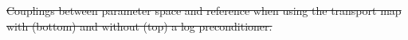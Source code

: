 \documentclass[final]{siamltex}
\newcommand\irregularcircle[2]{%
  \pgfextra {\pgfmathsetmacro\len{(#1)+rand*(#2)}}
  +(0:\len pt)
  \foreach \a in {10,20,...,350}{
    \pgfextra {\pgfmathsetmacro\len{(#1)+rand*(#2)}}
    -- +(\a:\len pt)
  } -- cycle
}
\providecommand{\DIFdel}[1]{{\protect\color{red}\sout{#1}}}                      %
\providecommand{\DIFdelbegin}{} %
\providecommand{\DIFdelend}{} %
\providecommand{\DIFdelFL}[1]{\DIFdel{#1}} %
\providecommand{\DIFdelbeginFL}{} %
\providecommand{\DIFdelendFL}{} %
\newcommand{\DIFscaledelfig}{0.5}
\newlength{\DIFdelgraphicswidth} %
\newlength{\DIFdelgraphicsheight} %
\newcommand{\DIFdelincludegraphics}[2][]{%
\sbox{\DIFdelgraphicsbox}{\DIFOincludegraphics[#1]{#2}}%
\settoboxwidth{\DIFdelgraphicswidth}{\DIFdelgraphicsbox} %
\settoboxtotalheight{\DIFdelgraphicsheight}{\DIFdelgraphicsbox} %
\scalebox{\DIFscaledelfig}{%
\parbox[b]{\DIFdelgraphicswidth}{\usebox{\DIFdelgraphicsbox}\\[-\baselineskip] \rule{\DIFdelgraphicswidth}{0em}}\llap{\resizebox{\DIFdelgraphicswidth}{\DIFdelgraphicsheight}{%
\setlength{\unitlength}{\DIFdelgraphicswidth}%
\begin{picture}(1,1)%
\thicklines\linethickness{2pt} %
{\color[rgb]{1,0,0}\put(0,0){\framebox(1,1){}}}%
{\color[rgb]{1,0,0}\put(0,0){\line( 1,1){1}}}%
{\color[rgb]{1,0,0}\put(0,1){\line(1,-1){1}}}%
\end{picture}%
}\hspace*{3pt}}} %
} %
\DeclareRobustCommand{\DIFdelbegin}{\DIFOdelbegin \let\includegraphics\DIFdelincludegraphics} %
\DeclareRobustCommand{\DIFdelend}{\DIFOaddend \let\includegraphics\DIFOincludegraphics} %
\DeclareRobustCommand{\DIFdelbeginFL}{\DIFOdelbeginFL \let\includegraphics\DIFdelincludegraphics} %
\DeclareRobustCommand{\DIFdelendFL}{\DIFOaddendFL \let\includegraphics\DIFOincludegraphics} %
\begin{document}
\DIFdelbegin %





\DIFdelendFL %

\DIFdelbeginFL %





{%
\DIFdelFL{Couplings between parameter space and reference
          when using the transport map with (bottom) and without (top)
        a log preconditioner.}}
\DIFdelend %
\end{document}
